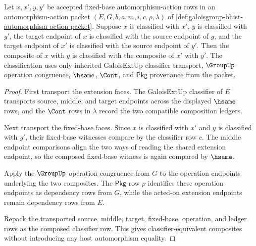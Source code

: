 \begin{theorem}
\label{thm:galoisgroup-composition-classifier-congruence}
Let $x,x',y,y'$ be accepted fixed-base automorphism-action rows in an
automorphism-action packet $(E,G,b,a,m,i,c,\rho,\lambda)$ of
\autoref{def:galoisgroup-bhist-automorphism-action-packet}. Suppose $x$ is
classified with $x'$, $y$ is classified with $y'$, the target endpoint of $x$
is classified with the source endpoint of $y$, and the target endpoint of
$x'$ is classified with the source endpoint of $y'$. Then the composite of
$x$ with $y$ is classified with the composite of $x'$ with $y'$. The
classification uses only inherited GaloisExtUp classifier transport,
$\GroupUp$ operation congruence, $\hsame$, $\Cont$, and $\mathsf{Pkg}$
provenance from the packet.
\end{theorem}
\begin{proof}
First transport the extension faces. The GaloisExtUp classifier of $E$
transports source, middle, and target endpoints across the displayed
$\hsame$ rows, and the $\Cont$ rows in $\lambda$ record the two compatible
composition ledgers.

Next transport the fixed-base faces. Since $x$ is classified with $x'$ and
$y$ is classified with $y'$, their fixed-base witnesses compare by the
classifier row $c$. The middle endpoint comparisons align the two ways of
reading the shared extension endpoint, so the composed fixed-base witness is
again compared by $\hsame$.

Apply the $\GroupUp$ operation congruence from $G$ to the operation endpoints
underlying the two composites. The $\mathsf{Pkg}$ row $\rho$ identifies these
operation endpoints as dependency rows from $G$, while the acted-on extension
endpoints remain dependency rows from $E$.

Repack the transported source, middle, target, fixed-base, operation, and
ledger rows as the composed classifier row. This gives classifier-equivalent
composites without introducing any host automorphism equality.
\end{proof}

